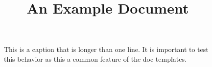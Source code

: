 \documentclass{doc-article}
\title{An Example Document}
\begin{document}
\maketitle


\lipsum[1]


\begin{figure}
  \caption{This is a caption that is longer than one line. It is important to test 
  this behavior as this a common feature of the doc templates.}
\end{figure}


\lipsum[2]
\end{document}

